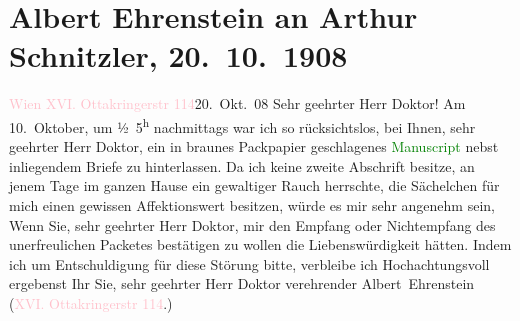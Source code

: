 

               \section[Albert Ehrenstein an Arthur Schnitzler, 20. 10. 1908]{ Albert Ehrenstein an Arthur Schnitzler, 20. 10. 1908}\nopagebreak{}\rehead{ }\normalsize\beginnumbering{} \toendnotes[C]{\smallbreak\pagebreak[2]} 
\toendnotes[C]{\smallbreak}\pstart
           {\pb}\textcolor{pink}{Wien XVI. Ottakringerstr 114}{}\ledrightnote{\textcolor{pink}{Ottakringerstraße}}\hfill 20. Okt. 08\pend
           \pstart{}Sehr geehrter Herr Doktor! \pend\pstart
           Am 10. Oktober, um ½ 5\textsuperscript{h} nachmittags war ich so rücksichtslos, bei Ihnen, sehr geehrter Herr
                    Doktor, ein in braunes Packpapier geschlagenes \textcolor{green}{Manuscript}{} nebst inliegendem Briefe zu
                    hinterlassen. Da ich keine zweite Abschrift besitze, an jenem Tage im ganzen
                    Hause ein gewaltiger Rauch herrschte, die Sächelchen für mich einen gewissen
                    Affektionswert besitzen, würde es mir sehr angenehm sein, Wenn
                    Sie, sehr geehrter Herr Doktor, {\pb}mir den Empfang oder Nichtempfang
                    des unerfreulichen Packetes bestätigen zu wollen die Liebenswürdigkeit hätten.
                    Indem ich um Entschuldigung für diese Störung bitte, verbleibe ich
                    Hochachtungsvoll ergebenst Ihr Sie, sehr geehrter Herr Doktor verehrender\pend
           \pstart \spacefill\mbox{Albert Ehrenstein}\pend{}\pstart
           \noindent{}(\textcolor{pink}{XVI. Ottakringerstr 114}{}\ledrightnote{\textcolor{pink}{Ottakringerstraße}}.)\pend
           \endnumbering{}  
      